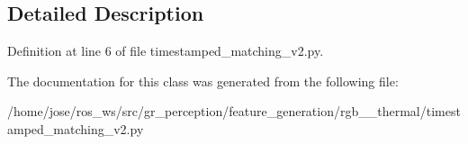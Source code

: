 \subsection{Detailed Description}


Definition at line 6 of file timestamped\+\_\+matching\+\_\+v2.\+py.



The documentation for this class was generated from the following file\+:\begin{DoxyCompactItemize}
\item 
/home/jose/ros\+\_\+ws/src/gr\+\_\+perception/feature\+\_\+generation/rgb\+\_\+\_\+thermal/timestamped\+\_\+matching\+\_\+v2.\+py\end{DoxyCompactItemize}
